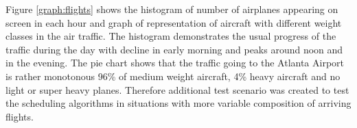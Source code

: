 Figure \ref{graph:flights} shows the histogram of number of airplanes appearing on screen in each hour and graph of representation of aircraft with different weight classes in the air traffic. The histogram demonstrates the usual progress of the traffic during the day with decline in early morning and peaks around noon and in the evening. The pie chart shows that the traffic going to the Atlanta Airport is rather monotonous 96\% of medium weight aircraft, 4\% heavy aircraft and no light or super heavy planes. Therefore additional test scenario was created to test the scheduling algorithms in situations with more variable composition of arriving flights.